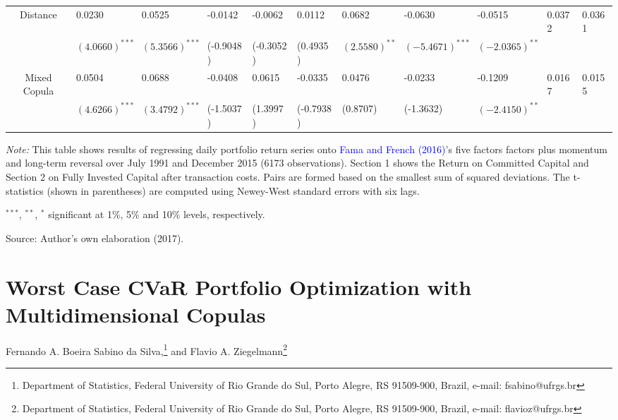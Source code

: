 \documentclass[a4paper,12pt]{report}
\begin{document}
\begin{sidewaystable}
\begin{threeparttable}[H]
\begin{tabularx}{\textwidth}{@{\extracolsep{\fill}} lllllllllll@{}}
			\multicolumn{1}{c}{Distance} & 0.0230 & 0.0525 & -0.0142 & -0.0062 & 0.0112 & 0.0682 & -0.0630 & -0.0515 & 0.0372 & 0.0361 \\
			\multicolumn{1}{c}{} & $(4.0660)^{***}$ & $(5.3566)^{***}$ & (-0.9048) & (-0.3052) & (0.4935) & $(2.5580)^{**}$ & $(-5.4671)^{***}$ & $(-2.0365)^{**}$ & & \\
			\multicolumn{1}{c}{Mixed Copula} & 0.0504 & 0.0688 & -0.0408 & 0.0615 & -0.0335 & 0.0476 & -0.0233 & -0.1209 & 0.0167 & 0.0155 \\
			\multicolumn{1}{c}{} & $(4.6266)^{***}$ & $(3.4792)^{***}$ & (-1.5037) & (1.3997) & (-0.7938) & (0.8707) & (-1.3632) & $(-2.4150)^{**}$ & & \\
			\bottomrule
		\end{tabularx}
		\begin{tablenotes}
			\item \textit{Note:} \tiny  This table shows results of regressing daily portfolio return series onto \textcolor{blue}{Fama and French} \textcolor{blue}{(2016)}'s five factors factors plus momentum and long-term reversal over July 1991 and December 2015 (6173 observations). Section 1 shows the Return on Committed Capital and Section 2 on Fully Invested Capital after transaction costs. Pairs are formed based on the smallest sum of squared deviations. The t-statistics (shown in parentheses) are computed using Newey-West standard errors with six lags.
			\item \scriptsize $^{\ast\ast\ast}$, $^{\ast\ast}$, $^{\ast}$  significant at 1\%, 5\% and 10\% levels, respectively.
			\item Source: Author's own elaboration (2017).
		\end{tablenotes}
	\end{threeparttable}%
	\label{tab:table105}%
\end{sidewaystable}%
	
	
	\newpage
	
\chapter{Worst Case CVaR Portfolio Optimization with Multidimensional Copulas}
\thispagestyle{myheadings}
\markright{}


\begin{center}\sc Fernando A. Boeira Sabino da Silva,\footnote{Department of Statistics, Federal University of Rio Grande do Sul, Porto Alegre, RS 91509-900, Brazil, e-mail: fsabino@ufrgs.br} and Flavio A. Ziegelmann\footnote{Department of Statistics, Federal University of Rio Grande do Sul, Porto Alegre, RS 91509-900, Brazil, e-mail: flavioz@ufrgs.br}\end{center}
\end{document}
